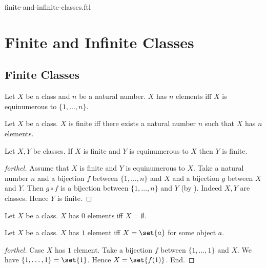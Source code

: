 \documentclass{naproche-library}
\begin{document}
\begin{smodule}{finite-and-infinite-classes.ftl}

  \section*{Finite and Infinite Classes}

  \subsection*{Finite Classes}

  \begin{definition}[forthel,id=FOUNDATIONS_14_3512046897512410]
    Let $X$ be a class and $n$ be a natural number.
    $X$ has $n$ elements iff $X$ is equinumerous to $\{ 1, \dots, n \}$.
  \end{definition}

  \begin{definition}[forthel,id=FOUNDATIONS_14_3694156977274880]
    Let $X$ be a class.
    $X$ is finite iff there exists a natural number $n$ such that $X$ has $n$ elements.
  \end{definition}

  \begin{proposition}[forthel,id=FOUNDATIONS_14_3929085203972096]
    Let $X, Y$ be classes.
    If $X$ is finite and $Y$ is equinumerous to $X$ then $Y$ is finite.
  \end{proposition}
  \begin{proof}[forthel]
    Assume that $X$ is finite and $Y$ is equinumerous to $X$.
    Take a natural number $n$ and a bijection $f$ between $\{ 1, \dots, n \}$ and $X$ and a bijection $g$ between $X$ and $Y$.
    Then $g \circ f$ is a bijection between $\{ 1, \dots, n \}$ and $Y$ (by ).
    Indeed $X, Y$ are classes.
    Hence $Y$ is finite.
  \end{proof}

  \begin{proposition}[forthel,id=FOUNDATIONS_14_5132547854597502]
    Let $X$ be a class.
    $X$ has $0$ elements iff $X = \emptyset$.
  \end{proposition}

  \begin{proposition}[forthel,id=FOUNDATIONS_14_6812054297034125]
    Let $X$ be a class.
    $X$ has $1$ element iff $X = \set{a}$ for some object $a$.
  \end{proposition}
  \begin{proof}[forthel]
    Case $X$ has $1$ element.
      Take a bijection $f$ between $\{ 1, \dots, 1 \}$ and $X$.
      We have $\{ 1, \dots, 1 \} = \set{1}$.
      Hence $X = \set{f(1)}$.
    End.


\end{proof}
\end{smodule}
\end{document}
